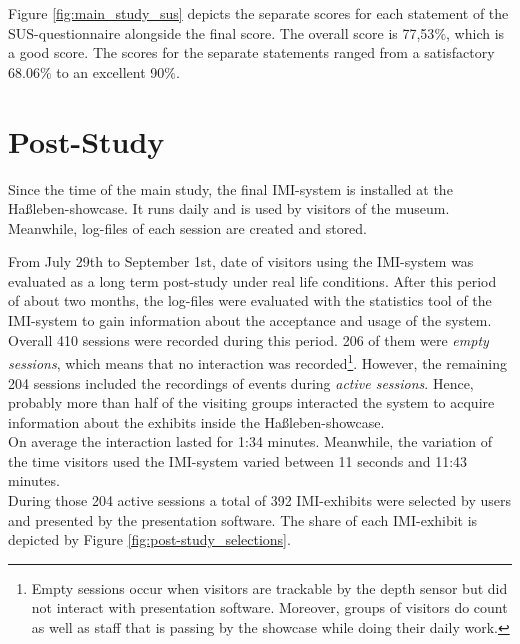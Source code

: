 Figure \ref{fig:main_study_sus} depicts the separate scores for each statement of the \ac{SUS}-questionnaire alongside the final score. The overall score is 77,53$\%$, which is a good score. The scores for the separate statements ranged from a satisfactory 68.06$\%$ to an excellent 90$\%$.


\section{Post-Study}
\label{evaluation_post}

Since the time of the main study, the final \ac{IMI}-system is installed at the Haßleben-showcase. It runs daily and is used by visitors of the museum. Meanwhile, log-files of each session are created and stored.

From July 29th to September 1st, date of visitors using the \ac{IMI}-system was evaluated as a long term post-study under real life conditions. After this period of about two months, the log-files were evaluated with the statistics tool of the \ac{IMI}-system to gain information about the acceptance and usage of the system.
\\
Overall 410 sessions were recorded during this period. 206 of them were \textit{empty sessions}, which means that no interaction was recorded\footnote{Empty sessions occur when visitors are trackable by the depth sensor but did not interact with presentation software. Moreover, groups of visitors do count as well as staff that is passing by the showcase while doing their daily work.}. However, the remaining 204 sessions included the recordings of events during \textit{active sessions}. Hence, probably more than half of the visiting groups interacted the system to acquire information about the exhibits inside the Haßleben-showcase.
\\
On average the interaction lasted for 1:34 minutes. Meanwhile, the variation of the time visitors used the \ac{IMI}-system varied between 11 seconds and 11:43 minutes.
\\
During those 204 active sessions a total of 392 \ac{IMI}-exhibits were selected by users and presented by the presentation software. The share of each \ac{IMI}-exhibit is depicted by Figure \ref{fig:post-study_selections}. 

